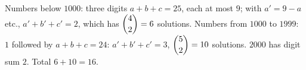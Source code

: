 Numbers below $1000$: three digits $a+b+c=25$, each at most $9$; with $a'=9-a$ etc., $a'+b'+c'=2$, which has $\dbinom42=6$ solutions. Numbers from $1000$ to $1999$: $1$ followed by $a+b+c=24$: $a'+b'+c'=3$, $\dbinom52=10$ solutions. $2000$ has digit sum $2$. Total $6+10=\boxed{16}$.
